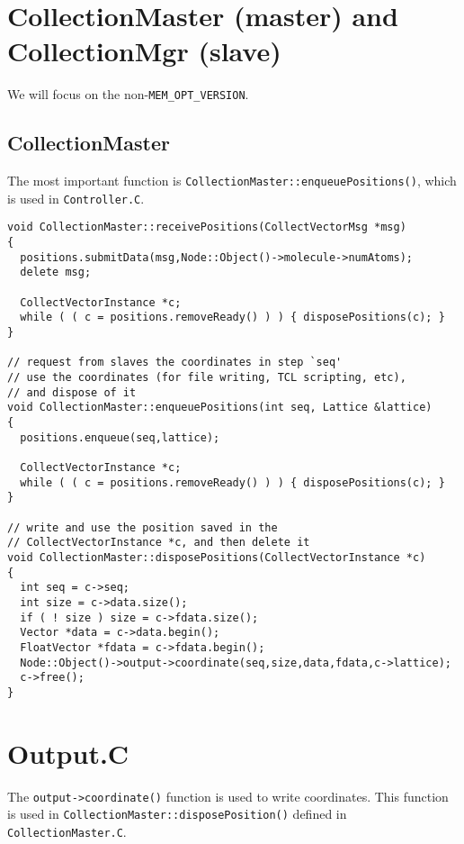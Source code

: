 \documentclass{article}
\begin{document}
\section{\label{sec:collection}CollectionMaster (master) and CollectionMgr (slave)}


We will focus on the non-\texttt{MEM\_OPT\_VERSION}.

\subsection{CollectionMaster}

The most important function is
\texttt{CollectionMaster::enqueuePositions()},
which is used in \texttt{Controller.C}.

\begin{lstlisting}
void CollectionMaster::receivePositions(CollectVectorMsg *msg)
{
  positions.submitData(msg,Node::Object()->molecule->numAtoms);
  delete msg;

  CollectVectorInstance *c;
  while ( ( c = positions.removeReady() ) ) { disposePositions(c); }
}

// request from slaves the coordinates in step `seq'
// use the coordinates (for file writing, TCL scripting, etc),
// and dispose of it
void CollectionMaster::enqueuePositions(int seq, Lattice &lattice)
{
  positions.enqueue(seq,lattice);

  CollectVectorInstance *c;
  while ( ( c = positions.removeReady() ) ) { disposePositions(c); }
}

// write and use the position saved in the
// CollectVectorInstance *c, and then delete it
void CollectionMaster::disposePositions(CollectVectorInstance *c)
{
  int seq = c->seq;
  int size = c->data.size();
  if ( ! size ) size = c->fdata.size();
  Vector *data = c->data.begin();
  FloatVector *fdata = c->fdata.begin();
  Node::Object()->output->coordinate(seq,size,data,fdata,c->lattice);
  c->free();
}
\end{lstlisting}




\section{Output.C}

The \texttt{output->coordinate()} function is used to write coordinates.
%
This function is used in \texttt{CollectionMaster::disposePosition()}
defined in \texttt{CollectionMaster.C}.
\end{document}
